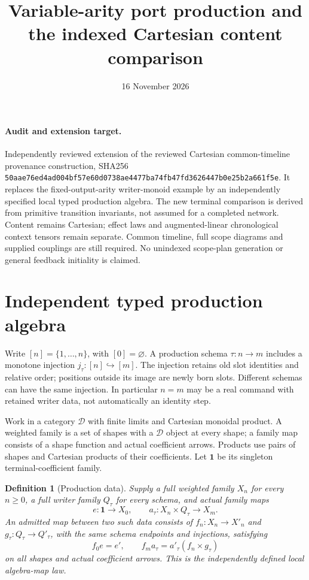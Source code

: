 \documentclass[11pt]{article}
\title{Variable-arity port production and the indexed Cartesian content comparison}
\date{16 November 2026}
\newtheorem{definition}{Definition}\newtheorem{theorem}[definition]{Theorem}\newtheorem{proposition}[definition]{Proposition}
\begin{document}
\maketitle
\paragraph{Audit and extension target.} Independently reviewed extension of the reviewed Cartesian common-timeline provenance construction, SHA256
\texttt{50aae76ed4ad004bf57e60d0738ae4477ba74fb47fd3626447b0e25b2a661f5e}.
It replaces the fixed-output-arity writer-monoid example by an independently specified local typed production algebra. The new terminal comparison is derived from primitive transition invariants, not assumed for a completed network. Content remains Cartesian; effect laws and augmented-linear chronological context tensors remain separate. Common timeline, full scope diagrams and supplied couplings are still required. No unindexed scope-plan generation or general feedback initiality is claimed.

\section{Independent typed production algebra}
Write $[n]=\{1,\ldots,n\}$, with $[0]=\varnothing$. A production schema $\tau:n\to m$ includes a monotone injection $j_\tau:[n]\hookrightarrow[m]$. The injection retains old slot identities and relative order; positions outside its image are newly born slots. Different schemas can have the same injection. In particular $n=m$ may be a real command with retained writer data, not automatically an identity step.

Work in a category $\mathcal D$ with finite limits and Cartesian monoidal product. A weighted family is a set of shapes with a $\mathcal D$ object at every shape; a family map consists of a shape function and actual coefficient arrows. Products use pairs of shapes and Cartesian products of their coefficients. Let $\mathbf1$ be its singleton terminal-coefficient family.

\begin{definition}[Production data]
Supply a full weighted family $X_n$ for every $n\geq0$, a full writer family $Q_\tau$ for every schema, and actual family maps
\[
 e:\mathbf1\longrightarrow X_0,\qquad
 a_\tau:X_n\times Q_\tau\longrightarrow X_m.
\]
An admitted map between two such data consists of $f_n:X_n\to X'_n$ and $g_\tau:Q_\tau\to Q'_\tau$, with the same schema endpoints and injections, satisfying
\[
 f_0e=e',\qquad f_m a_\tau=a'_\tau(f_n\times g_\tau)
\]
on all shapes and actual coefficient arrows. This is the independently defined local algebra-map law.
\end{definition}
\end{document}

